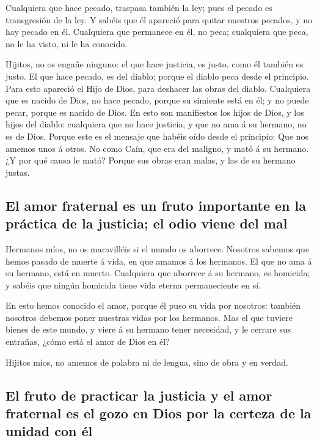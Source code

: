  Cualquiera que hace pecado, traspasa también la ley; pues
el pecado es transgresión de la ley.  Y sabéis que él
apareció para quitar nuestros pecados, y no hay pecado en él.
 Cualquiera que permanece en él, no peca; cualquiera que
peca, no le ha visto, ni le ha conocido.

 Hijitos, no os engañe ninguno: el que hace justicia, es
justo, como él también es justo.  El que hace pecado, es del
diablo; porque el diablo peca desde el principio. Para esto apareció el
Hijo de Dios, para deshacer las obras del diablo. 
Cualquiera que es nacido de Dios, no hace pecado, porque su simiente
está en él; y no puede pecar, porque es nacido de Dios.  En
esto son manifiestos los hijos de Dios, y los hijos del diablo:
cualquiera que no hace justicia, y que no ama á su hermano, no es de
Dios.  Porque este es el mensaje que habéis oído desde el
principio: Que nos amemos unos á otros.  No como Caín, que
era del maligno, y mató á su hermano. ¿Y por qué causa le mató? Porque
sus obras eran malas, y las de su hermano justas.

\hypertarget{el-amor-fraternal-es-un-fruto-importante-en-la-pruxe1ctica-de-la-justicia-el-odio-viene-del-mal}{%
\subsection{El amor fraternal es un fruto importante en la práctica de
la justicia; el odio viene del
mal}\label{el-amor-fraternal-es-un-fruto-importante-en-la-pruxe1ctica-de-la-justicia-el-odio-viene-del-mal}}

 Hermanos míos, no os maravilléis si el mundo os aborrece.
 Nosotros sabemos que hemos pasado de muerte á vida, en que
amamos á los hermanos. El que no ama á su hermano, está en muerte.
 Cualquiera que aborrece á su hermano, es homicida; y
sabéis que ningún homicida tiene vida eterna permaneciente en sí.

 En esto hemos conocido el amor, porque él puso su vida por
nosotros: también nosotros debemos poner nuestras vidas por los
hermanos.  Mas el que tuviere bienes de este mundo, y viere
á su hermano tener necesidad, y le cerrare sus entrañas, ¿cómo está el
amor de Dios en él?

 Hijitos míos, no amemos de palabra ni de lengua, sino de
obra y en verdad.

\hypertarget{el-fruto-de-practicar-la-justicia-y-el-amor-fraternal-es-el-gozo-en-dios-por-la-certeza-de-la-unidad-con-uxe9l}{%
\subsection{El fruto de practicar la justicia y el amor fraternal es el
gozo en Dios por la certeza de la unidad con
él}\label{el-fruto-de-practicar-la-justicia-y-el-amor-fraternal-es-el-gozo-en-dios-por-la-certeza-de-la-unidad-con-uxe9l}}

